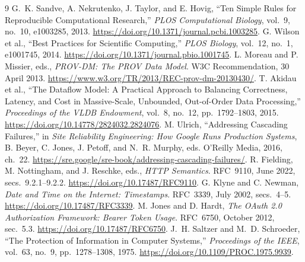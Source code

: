 \documentclass[10pt,a4paper]{article}
\begin{document}
\begin{thebibliography}{9}
\small
{} G.~K. Sandve, A. Nekrutenko, J. Taylor, and E. Hovig, ``Ten Simple Rules for Reproducible Computational Research,'' \emph{PLOS Computational Biology}, vol.~9, no.~10, e1003285, 2013. \url{https://doi.org/10.1371/journal.pcbi.1003285}.
 G. Wilson et al., ``Best Practices for Scientific Computing,'' \emph{PLOS Biology}, vol.~12, no.~1, e1001745, 2014. \url{https://doi.org/10.1371/journal.pbio.1001745}.
 L. Moreau and P. Missier, eds., \emph{PROV-DM: The PROV Data Model}. W3C Recommendation, 30 April 2013. \url{https://www.w3.org/TR/2013/REC-prov-dm-20130430/}.
 T. Akidau et al., ``The Dataflow Model: A Practical Approach to Balancing Correctness, Latency, and Cost in Massive-Scale, Unbounded, Out-of-Order Data Processing,'' \emph{Proceedings of the VLDB Endowment}, vol.~8, no.~12, pp.~1792--1803, 2015. \url{https://doi.org/10.14778/2824032.2824076}.
 M. Ulrich, ``Addressing Cascading Failures,'' in \emph{Site Reliability Engineering: How Google Runs Production Systems}, B. Beyer, C. Jones, J. Petoff, and N.~R. Murphy, eds. O'Reilly Media, 2016, ch.~22. \url{https://sre.google/sre-book/addressing-cascading-failures/}.
 R. Fielding, M. Nottingham, and J. Reschke, eds., \emph{HTTP Semantics}. RFC~9110, June 2022, secs.~9.2.1--9.2.2. \url{https://doi.org/10.17487/RFC9110}.
 G. Klyne and C. Newman, \emph{Date and Time on the Internet: Timestamps}. RFC~3339, July 2002, secs.~4--5. \url{https://doi.org/10.17487/RFC3339}.
 M. Jones and D. Hardt, \emph{The OAuth 2.0 Authorization Framework: Bearer Token Usage}. RFC~6750, October 2012, sec.~5.3. \url{https://doi.org/10.17487/RFC6750}.
 J.~H. Saltzer and M.~D. Schroeder, ``The Protection of Information in Computer Systems,'' \emph{Proceedings of the IEEE}, vol.~63, no.~9, pp.~1278--1308, 1975. \url{https://doi.org/10.1109/PROC.1975.9939}.
\end{thebibliography}

\clearpage
\appendix
\end{document}
